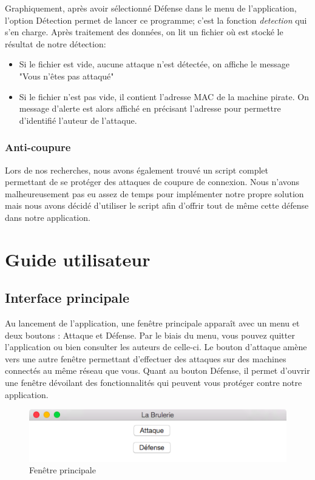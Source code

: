 \documentclass[11pt]{article}
\begin{document}
Graphiquement, après avoir sélectionné Défense dans le menu de l'application, l'option Détection permet de lancer ce programme; c'est la fonction \textit{detection} qui s'en charge. Après traitement des données, on lit un fichier où est stocké le résultat de notre détection:
\begin{itemize}
	\item Si le fichier est vide, aucune attaque n'est détectée, on affiche le message "Vous n'êtes pas attaqué"
	\item Si le fichier n'est pas vide, il contient l'adresse MAC de la machine pirate. On message d'alerte est alors affiché en précisant l'adresse pour permettre d'identifié l'auteur de l'attaque.
	
\end{itemize}



\subsubsection{Anti-coupure}
Lors de nos recherches, nous avons également trouvé un script complet permettant de se protéger des attaques de coupure de connexion. Nous n'avons malheureusement pas eu assez de temps pour implémenter notre propre solution mais nous avons décidé d'utiliser le script afin d'offrir tout de même cette défense dans notre application.


\section{Guide utilisateur}
\subsection{Interface principale}
Au lancement de l'application, une fenêtre principale apparaît avec un menu et deux boutons : Attaque et Défense. Par le biais du menu, vous pouvez quitter l'application ou bien consulter les auteurs de celle-ci. Le bouton d'attaque amène vers une autre fenêtre permettant d'effectuer des attaques sur des machines connectés au même réseau que vous. Quant au bouton Défense, il permet d'ouvrir une fenêtre dévoilant des fonctionnalités qui peuvent vous protéger contre notre application.
\begin{figure}[!h]
\centering
\includegraphics[scale=0.6]{./Captures/fenetrePrinc.png}
\caption{Fenêtre principale}
\end{figure}
\end{document}

